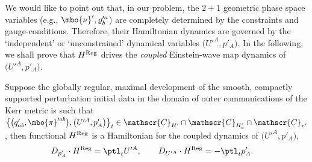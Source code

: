 We would like to point out that, in our problem, the $2+1$ geometric phase space variables \big(e.g., $\mbo{\nu}', \varrho'^a_b$\big) are completely determined by the constraints and gauge-conditions. Therefore, their Hamiltonian dynamics are governed by the `independent' or `unconstrained' dynamical variables $\bigl(U'^A, p'_A\bigr)$. In the following, we shall prove that $H^{{\rm Reg}}$ drives the \emph{coupled} Einstein-wave map dynamics of $\bigl(U'^A, p'_A\bigr)$.

\begin{Theorem}
Suppose the globally regular, maximal development of the smooth, compactly supported perturbation initial data in the domain of outer communications of the Kerr metric is such that $\bigl\{ \bigl(q'_{ab}, \mbo{\pi}'^{ab}\bigr), \bigl(U'^A, p'_A\bigr) \bigr\}_{t} \in \mathscr{C}_{H'} \cap \mathscr{C}_{H'_a} \cap \mathscr{C}_{\tau'}$, then functional $H^{{\rm Reg}}$ is a Hamiltonian for the coupled dynamics of $\bigl(U'^A, p'_A\bigr)$,
\begin{align*}
&D_{p'_A} \cdot H^{{\rm Reg}} = \ptl_t U'^A, \qquad
D_{U'^{A}} \cdot H^{{\rm Reg}} =- \ptl_t p'_A.
\end{align*}
\end{Theorem}
